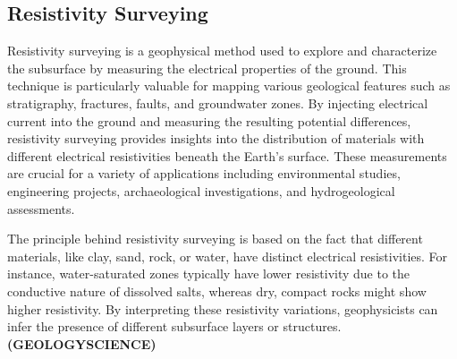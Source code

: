 \documentclass[12pt,a4paper]{report}
\begin{document}
\subsection{Resistivity Surveying}
Resistivity surveying is a geophysical method used to explore and characterize the subsurface by measuring the electrical properties of the ground. This technique is particularly valuable for mapping various geological features such as stratigraphy, fractures, faults, and groundwater zones. By injecting electrical current into the ground and measuring the resulting potential differences, resistivity surveying provides insights into the distribution of materials with different electrical resistivities beneath the Earth's surface. These measurements are crucial for a variety of applications including environmental studies, engineering projects, archaeological investigations, and hydrogeological assessments.

The principle behind resistivity surveying is based on the fact that different materials, like clay, sand, rock, or water, have distinct electrical resistivities. For instance, water-saturated zones typically have lower resistivity due to the conductive nature of dissolved salts, whereas dry, compact rocks might show higher resistivity. By interpreting these resistivity variations, geophysicists can infer the presence of different subsurface layers or structures. \\ \textbf{(GEOLOGYSCIENCE)}
\end{document}
